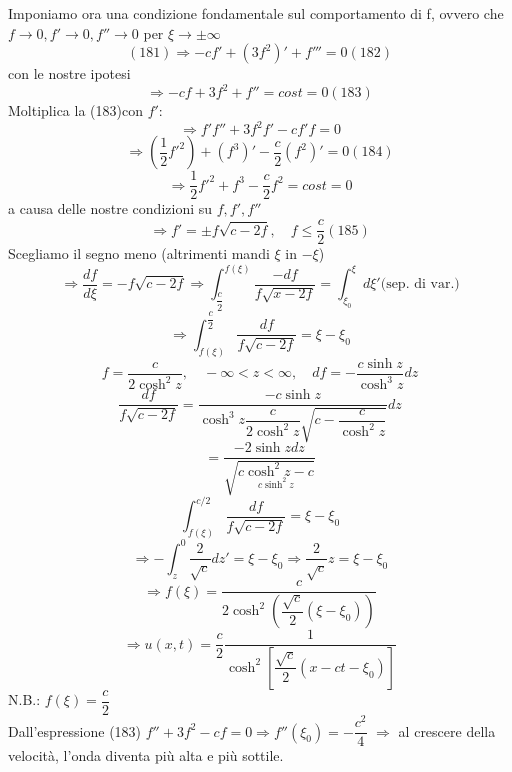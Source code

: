 \documentclass[a4paper,11pt]{report}
\begin{document}
Imponiamo ora una condizione fondamentale sul comportamento di f, ovvero che $f\to 0, f'\to 0, f''\to 0$ per $\xi \to \pm \infty$
\begin{equation}
(181)\Rightarrow -cf' + (3f^2)' + f'''=0(182)
\end{equation}
con le nostre ipotesi
\begin{equation}
\Rightarrow -cf + 3f^2 + f''=cost=0 (183)
\end{equation}
Moltiplica la (183)con $f'$:
$$
\Rightarrow f'f'' + 3f^2f'-cf'f=0 
$$
\begin{equation}
\Rightarrow \left(\dfrac{1}{2}f'^2\right) + (f^3)' - \dfrac{c}{2}(f^2)'=0 (184)
\end{equation}
$$
\Rightarrow \dfrac{1}{2}f'^2+f^3-\dfrac{c}{2}f^2 = cost=0
$$
a causa delle nostre condizioni su $f,f',f''$
\begin{equation}
\Rightarrow f'=\pm f\sqrt{c-2f}, \quad f\le \dfrac{c}{2} (185)
\end{equation}
Scegliamo il segno meno (altrimenti mandi $\xi$ in $-\xi$)
$$
\Rightarrow \dfrac{df}{d\xi}=-f\sqrt{c-2f}\Rightarrow\int_{\dfrac{c}{2}}^{f(\xi)}\dfrac{-df}{f\sqrt{x-2f}}=\int_{\xi_0}^{\xi}d\xi' \text{(sep. di var.)}
$$
$$
\Rightarrow\int_{f(\xi)}^{\dfrac{c}{2}}\dfrac{df}{f\sqrt{c-2f}}=\xi - \xi_0
$$
$$
f=\dfrac{c}{2\cosh^2 z},\quad -\infty<z<\infty, \quad df=-\dfrac{c\sinh z}{\cosh^3 z}dz
$$
$$
\dfrac{df}{f\sqrt{c-2f}}=\dfrac{-c \sinh z}{\cosh^3 z\dfrac{c}{2\cosh^2z}\sqrt{c-\dfrac{c}{\cosh^2 z}}}dz
$$
$$
=\dfrac{-2\sinh z dz}{\sqrt{\underset{c\sinh^2 z}{c\cosh^2z - c}}}
$$
$$
\int_{f(\xi)}^{c/2}\dfrac{df}{f\sqrt{c-2f}}=\xi - \xi_0
$$
$$
\Rightarrow - \int_z^0 \dfrac{2}{\sqrt{c}}dz'=\xi - \xi_0 \Rightarrow\dfrac{2}{\sqrt{c}}z=\xi - \xi_0
$$
$$
\Rightarrow f(\xi)=\dfrac{c}{2\cosh^2 \left(\dfrac{\sqrt{c}}{2}(\xi-\xi_0)\right)}
$$
$$
\Rightarrow u(x,t)=\dfrac{c}{2}\dfrac{1}{\cosh^2 \left[\dfrac{\sqrt{c}}{2}(x-ct-\xi_0)\right]}
$$
N.B.: $f(\xi)=\dfrac{c}{2}$\\
Dall'espressione (183) $f'' + 3f^2 - cf=0 \Rightarrow f''(\xi_0)=-\dfrac{c^2}{4}$
$\Rightarrow$ al crescere della velocità, l'onda diventa più alta e più sottile.
\end{document}
